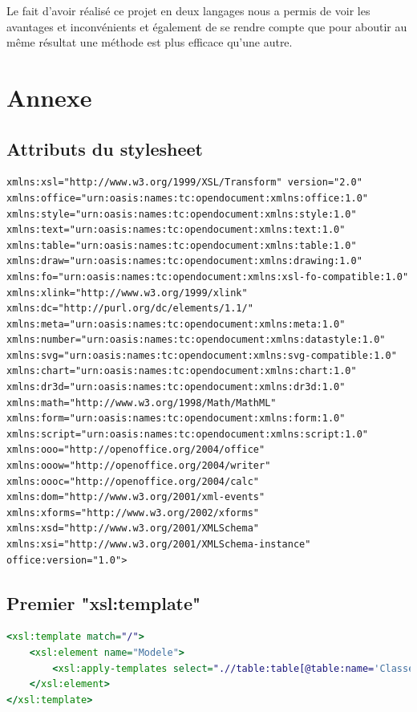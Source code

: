 \documentclass[11pt]{report}
\begin{document}
Le fait d'avoir réalisé ce projet en deux langages nous a permis de voir les avantages et inconvénients et également de se rendre compte que pour aboutir au même résultat une méthode est plus efficace qu'une autre.



\chapter{Annexe}

\section{Attributs du stylesheet}
\begin{lstlisting}[language=XSLT]
xmlns:xsl="http://www.w3.org/1999/XSL/Transform" version="2.0"
xmlns:office="urn:oasis:names:tc:opendocument:xmlns:office:1.0" 
xmlns:style="urn:oasis:names:tc:opendocument:xmlns:style:1.0" 
xmlns:text="urn:oasis:names:tc:opendocument:xmlns:text:1.0" 
xmlns:table="urn:oasis:names:tc:opendocument:xmlns:table:1.0"
xmlns:draw="urn:oasis:names:tc:opendocument:xmlns:drawing:1.0"
xmlns:fo="urn:oasis:names:tc:opendocument:xmlns:xsl-fo-compatible:1.0" 
xmlns:xlink="http://www.w3.org/1999/xlink" 
xmlns:dc="http://purl.org/dc/elements/1.1/"
xmlns:meta="urn:oasis:names:tc:opendocument:xmlns:meta:1.0" 
xmlns:number="urn:oasis:names:tc:opendocument:xmlns:datastyle:1.0"
xmlns:svg="urn:oasis:names:tc:opendocument:xmlns:svg-compatible:1.0"
xmlns:chart="urn:oasis:names:tc:opendocument:xmlns:chart:1.0"
xmlns:dr3d="urn:oasis:names:tc:opendocument:xmlns:dr3d:1.0"
xmlns:math="http://www.w3.org/1998/Math/MathML"
xmlns:form="urn:oasis:names:tc:opendocument:xmlns:form:1.0"
xmlns:script="urn:oasis:names:tc:opendocument:xmlns:script:1.0"
xmlns:ooo="http://openoffice.org/2004/office"
xmlns:ooow="http://openoffice.org/2004/writer"
xmlns:oooc="http://openoffice.org/2004/calc"
xmlns:dom="http://www.w3.org/2001/xml-events"
xmlns:xforms="http://www.w3.org/2002/xforms"
xmlns:xsd="http://www.w3.org/2001/XMLSchema"
xmlns:xsi="http://www.w3.org/2001/XMLSchema-instance" 
office:version="1.0">
\end{lstlisting}


\section{Premier "xsl:template"}
\begin{lstlisting}[language=XSLT]
<xsl:template match="/">
    <xsl:element name="Modele">
        <xsl:apply-templates select=".//table:table[@table:name='Classes']/table:table-row/following-sibling::table:table-row[1]"/>
    </xsl:element>
</xsl:template>
\end{lstlisting}
\end{document}

